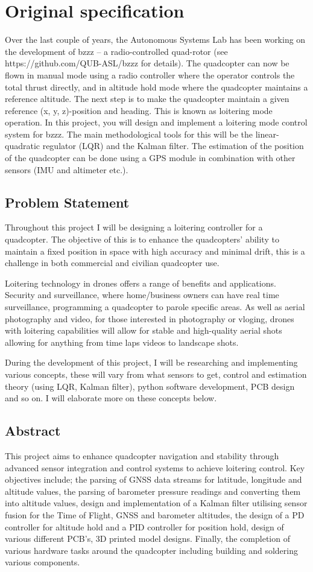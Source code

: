\documentclass{report}
\begin{document}
\section*{Original specification}
Over the last couple of years, the Autonomous Systems Lab has been working on
the development of bzzz – a radio-controlled quad-rotor (see
https://github.com/QUB-ASL/bzzz for details). The quadcopter can now be flown in
manual mode using a radio controller where the operator controls the total
thrust directly, and in altitude hold mode where the quadcopter maintains a
reference altitude. The next step is to make the quadcopter maintain a given
reference (x, y, z)-position and heading. This is known as loitering mode
operation. In this project, you will design and implement a loitering mode
control system for bzzz. The main methodological tools for this will be the
linear-quadratic regulator (LQR) and the Kalman filter. The estimation of the
position of the quadcopter can be done using a GPS module in combination with
other sensors (IMU and altimeter etc.).
\subsection*{Problem Statement}
Throughout this project I will be designing a loitering controller for a
quadcopter. The objective of this is to enhance the quadcopters' ability to
maintain a fixed position in space with high accuracy and minimal drift, this is
a challenge in both commercial and civilian quadcopter use.

Loitering technology in drones offers a range of benefits and applications.
Security and surveillance, where home/business owners can have real time
surveillance, programming a quadcopter to parole specific areas. As well as
aerial photography and video, for those interested in photography or vloging,
drones with loitering capabilities will allow for stable and high-quality aerial
shots allowing for anything from time laps videos to landscape shots.

During the development of this project, I will be researching and implementing
various concepts, these will vary from what sensors to get, control and
estimation theory (using LQR, Kalman filter), python software development, PCB
design and so on. I will elaborate more on these concepts below.

\subsection*{Abstract}
This project aims to enhance quadcopter navigation and stability through advanced sensor integration and control systems to achieve loitering control. Key objectives include; the parsing of GNSS data streams for latitude, longitude and altitude values, the parsing of barometer pressure readings and converting them into altitude values, design and implementation of a Kalman filter utilising sensor fusion for the Time of Flight, GNSS and barometer altitudes, the design of a PD controller for altitude hold and a PID controller for position hold, design of various different PCB's, 3D printed model designs. Finally, the completion of various hardware tasks around the quadcopter including building and soldering various components.
\end{document}
